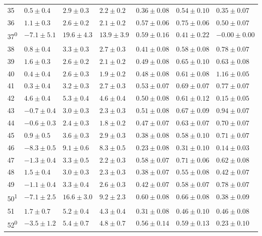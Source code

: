 \begin{tabular}{l l l l l l l}
35 & $0.5 \pm 0.4$ & $2.9 \pm 0.3$ & $2.2 \pm 0.2$ & $0.36 \pm 0.08$ & $0.54 \pm 0.10$ & $0.35 \pm 0.07$ \\ 
36 & $1.1 \pm 0.3$ & $2.6 \pm 0.2$ & $2.1 \pm 0.2$ & $0.57 \pm 0.06$ & $0.75 \pm 0.06$ & $0.50 \pm 0.07$ \\ 
37\textsuperscript{0} & $-7.1 \pm 5.1$ & $19.6 \pm 4.3$ & $13.9 \pm 3.9$ & $0.59 \pm 0.16$ & $0.41 \pm 0.22$ & $-0.00 \pm 0.00$ \\ 
38 & $0.8 \pm 0.4$ & $3.3 \pm 0.3$ & $2.7 \pm 0.3$ & $0.41 \pm 0.08$ & $0.58 \pm 0.08$ & $0.78 \pm 0.07$ \\ 
39 & $1.6 \pm 0.3$ & $2.6 \pm 0.2$ & $2.1 \pm 0.2$ & $0.49 \pm 0.08$ & $0.65 \pm 0.10$ & $0.63 \pm 0.08$ \\ 
40 & $0.4 \pm 0.4$ & $2.6 \pm 0.3$ & $1.9 \pm 0.2$ & $0.48 \pm 0.08$ & $0.61 \pm 0.08$ & $1.16 \pm 0.05$ \\ 
41 & $0.3 \pm 0.4$ & $3.2 \pm 0.3$ & $2.7 \pm 0.3$ & $0.53 \pm 0.07$ & $0.69 \pm 0.07$ & $0.77 \pm 0.07$ \\ 
42 & $4.6 \pm 0.4$ & $5.3 \pm 0.4$ & $4.6 \pm 0.4$ & $0.50 \pm 0.08$ & $0.61 \pm 0.12$ & $0.15 \pm 0.05$ \\ 
43 & $-0.7 \pm 0.4$ & $3.0 \pm 0.3$ & $2.3 \pm 0.3$ & $0.51 \pm 0.08$ & $0.67 \pm 0.09$ & $0.94 \pm 0.07$ \\ 
44 & $-0.6 \pm 0.3$ & $2.4 \pm 0.3$ & $1.8 \pm 0.2$ & $0.47 \pm 0.07$ & $0.63 \pm 0.07$ & $0.70 \pm 0.07$ \\ 
45 & $0.9 \pm 0.5$ & $3.6 \pm 0.3$ & $2.9 \pm 0.3$ & $0.38 \pm 0.08$ & $0.58 \pm 0.10$ & $0.71 \pm 0.07$ \\ 
46 & $-8.3 \pm 0.5$ & $9.1 \pm 0.6$ & $8.3 \pm 0.5$ & $0.23 \pm 0.08$ & $0.31 \pm 0.10$ & $0.14 \pm 0.03$ \\ 
47 & $-1.3 \pm 0.4$ & $3.3 \pm 0.5$ & $2.2 \pm 0.3$ & $0.58 \pm 0.07$ & $0.71 \pm 0.06$ & $0.62 \pm 0.08$ \\ 
48 & $1.5 \pm 0.4$ & $3.0 \pm 0.3$ & $2.3 \pm 0.3$ & $0.38 \pm 0.07$ & $0.55 \pm 0.08$ & $0.42 \pm 0.07$ \\ 
49 & $-1.1 \pm 0.4$ & $3.3 \pm 0.4$ & $2.6 \pm 0.3$ & $0.42 \pm 0.07$ & $0.58 \pm 0.07$ & $0.78 \pm 0.07$ \\ 
50\textsuperscript{1} & $-7.1 \pm 2.5$ & $16.6 \pm 3.0$ & $9.2 \pm 2.3$ & $0.60 \pm 0.08$ & $0.66 \pm 0.08$ & $0.38 \pm 0.09$ \\ 
51 & $1.7 \pm 0.7$ & $5.2 \pm 0.4$ & $4.3 \pm 0.4$ & $0.31 \pm 0.08$ & $0.46 \pm 0.10$ & $0.46 \pm 0.08$ \\ 
52\textsuperscript{0} & $-3.5 \pm 1.2$ & $5.4 \pm 0.7$ & $4.8 \pm 0.7$ & $0.56 \pm 0.14$ & $0.59 \pm 0.13$ & $0.23 \pm 0.10$ \\ 

\end{tabular}

